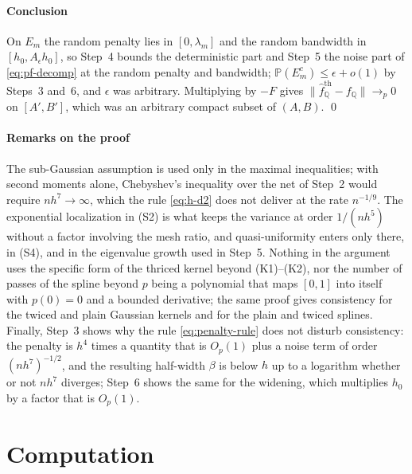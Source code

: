 \documentclass[preprint,12pt,authoryear,times]{elsarticle}
\newcommand{\Q}{\mathbb{Q}}
\newcommand{\Prob}{\mathbb{P}}
\newcommand{\fhat}{\hat f_{\Q}}
\begin{document}
\paragraph{Conclusion}
On \(E_m\) the random penalty lies in \([0,\lambda_m]\) and the random bandwidth in \([h_0,A_\epsilon h_0]\), so Step~4 bounds the deterministic part and Step~5 the noise part of \eqref{eq:pf-decomp} at the random penalty and bandwidth; \(\Prob(E_m^c)\le\epsilon+o(1)\) by Steps~3 and~6, and \(\epsilon\) was arbitrary. Multiplying by \(-F\) gives \(\|\fhat^{\mathrm{th}}-f_{\Q}\|\to_p 0\) on \([A',B']\), which was an arbitrary compact subset of \((A,B)\). \qed

\paragraph{Remarks on the proof}
The sub-Gaussian assumption is used only in the maximal inequalities; with second moments alone, Chebyshev's inequality over the net of Step~2 would require \(nh^7\to\infty\), which the rule \eqref{eq:h-d2} does not deliver at the rate \(n^{-1/9}\). The exponential localization in (S2) is what keeps the variance at order \(1/(nh^5)\) without a factor involving the mesh ratio, and quasi-uniformity enters only there, in (S4), and in the eigenvalue growth used in Step~5. Nothing in the argument uses the specific form of the thriced kernel beyond (K1)--(K2), nor the number of passes of the spline beyond \(p\) being a polynomial that maps \([0,1]\) into itself with \(p(0)=0\) and a bounded derivative; the same proof gives consistency for the twiced and plain Gaussian kernels and for the plain and twiced splines. Finally, Step~3 shows why the rule \eqref{eq:penalty-rule} does not disturb consistency: the penalty is \(h^4\) times a quantity that is \(O_p(1)\) plus a noise term of order \((nh^7)^{-1/2}\), and the resulting half-width \(\beta\) is below \(h\) up to a logarithm whether or not \(nh^7\) diverges; Step~6 shows the same for the widening, which multiplies \(h_0\) by a factor that is \(O_p(1)\).

\section{Computation}
\label{app:compute}
\end{document}
